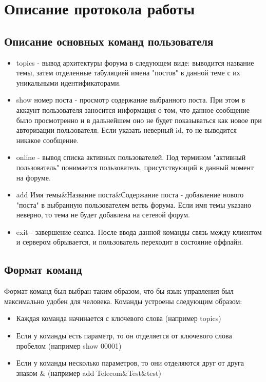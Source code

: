 \documentclass[10pt,a4paper]{report}
\begin{document}
\chapter{Описание протокола работы}
\section{Описание основных команд пользователя}
\begin{itemize}
\item topics - вывод архитектуры форума в следующем виде: выводится название темы, затем отделенные табуляцией имена "постов" в данной теме с их уникальными идентификаторами.
\item show номер поста - просмотр содержание выбранного поста. При этом в аккаунт пользователя заносится информация о том, что данное сообщение было просмотренно и в дальнейшем оно не будет показываться как новое при авторизации пользователя. Если указать неверный id, то не выводится никакое сообщение.
\item online - вывод списка активных пользователей. Под термином "активный пользователь" понимается пользователь, присутствующий в данный момент на форуме.
\item add Имя темы\&Название поста\&Содержание поста - добавление нового "поста" в выбранную пользователем ветвь форума. Если имя темы указано неверно, то тема не будет добавлена на сетевой форум.
\item exit - завершение сеанса. После ввода данной команды связь между клиентом и сервером обрывается, и пользователь переходит в состояние оффлайн.
\end{itemize}
\section{Формат команд}
Формат команд был выбран таким образом, что бы язык управления был максимально удобен для человека. Команды устроены следующим образом:
\begin{itemize}
\item Каждая команда начинается с ключевого слова (например topics)
\item Если у команды есть параметр, то он отделяется от ключевого слова пробелом (например show 00001)
\item Если у команды несколько параметров, то они отделяются друг от друга знаком \& (например add Telecom\&Test\&test)
\end{itemize}
\end{document}
